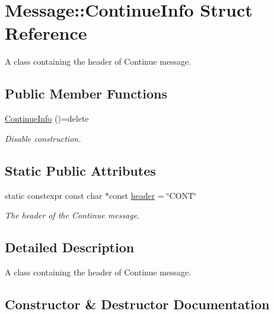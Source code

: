 \hypertarget{struct_message_1_1_continue_info}{}\section{Message\+:\+:Continue\+Info Struct Reference}
\label{struct_message_1_1_continue_info}


A class containing the header of Continue message.  


\subsection*{Public Member Functions}
\begin{DoxyCompactItemize}
\item 
\hyperlink{struct_message_1_1_continue_info_a62b0a1566f498a063de3a0181ec6977c}{Continue\+Info} ()=delete
\begin{DoxyCompactList}\small\item\em Disable construction. \end{DoxyCompactList}\end{DoxyCompactItemize}
\subsection*{Static Public Attributes}
\begin{DoxyCompactItemize}
\item 
static constexpr const char $\ast$const \hyperlink{struct_message_1_1_continue_info_ae80c96209d5d458d4abdf847e53f3437}{header} = \char`\"{}C\+O\+NT\char`\"{}
\begin{DoxyCompactList}\small\item\em The header of the Continue message. \end{DoxyCompactList}\end{DoxyCompactItemize}


\subsection{Detailed Description}
A class containing the header of Continue message. 

\subsection{Constructor \& Destructor Documentation}
